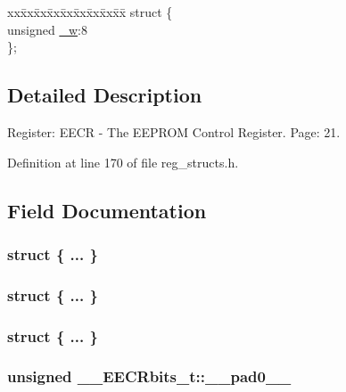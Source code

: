 \begin{DoxyCompactItemize}
\begin{tabbing}
\end{tabbing}\item 
\begin{tabbing}
xx\=xx\=xx\=xx\=xx\=xx\=xx\=xx\=xx\=\kill
struct \{\\
\>unsigned \hyperlink{union_____e_e_c_rbits__t_a8384ea2b9a07f8501c0d4a00a282a1d4}{\_w}:8\\
\}; \\

\end{tabbing}\end{DoxyCompactItemize}


\subsection{Detailed Description}
Register\+: E\+E\+C\+R -\/ The E\+E\+P\+R\+O\+M Control Register. Page\+: 21. 

Definition at line 170 of file reg\+\_\+structs.\+h.



\subsection{Field Documentation}
\hypertarget{union_____e_e_c_rbits__t_a8c3b00531e6990edd031c6b673426728}{\subsubsection[{"@37}]{\setlength{\rightskip}{0pt plus 5cm}struct \{ ... \} }}\label{union_____e_e_c_rbits__t_a8c3b00531e6990edd031c6b673426728}
\hypertarget{union_____e_e_c_rbits__t_ac1f3213ba1e2edcf1fafc373abd34a1e}{\subsubsection[{"@39}]{\setlength{\rightskip}{0pt plus 5cm}struct \{ ... \} }}\label{union_____e_e_c_rbits__t_ac1f3213ba1e2edcf1fafc373abd34a1e}
\hypertarget{union_____e_e_c_rbits__t_af23c40121db7567e06824152574c55a9}{\subsubsection[{"@41}]{\setlength{\rightskip}{0pt plus 5cm}struct \{ ... \} }}\label{union_____e_e_c_rbits__t_af23c40121db7567e06824152574c55a9}
\hypertarget{union_____e_e_c_rbits__t_a93f9aefb9c2f57aee765328c81531b76}{
\subsubsection[{\+\_\+\+\_\+pad0\+\_\+\+\_\+}]{\setlength{\rightskip}{0pt plus 5cm}unsigned \+\_\+\+\_\+\+E\+E\+C\+Rbits\+\_\+t\+::\+\_\+\+\_\+pad0\+\_\+\+\_\+}}\label{union_____e_e_c_rbits__t_a93f9aefb9c2f57aee765328c81531b76}



